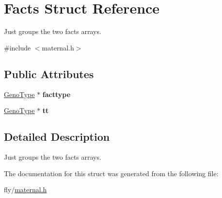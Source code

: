 \hypertarget{structFacts}{
\section{Facts Struct Reference}
\label{structFacts}
}


Just groups the two facts arrays.  


{\ttfamily \#include $<$maternal.h$>$}\subsection*{Public Attributes}
\begin{DoxyCompactItemize}
\item 
\hypertarget{structFacts_a0d792f87a2746b6e62a3f22ebc82898a}{
\hyperlink{structGenoType}{GenoType} $\ast$ {\bfseries facttype}}
\label{structFacts_a0d792f87a2746b6e62a3f22ebc82898a}

\item 
\hypertarget{structFacts_a31f1b9a8105c6b14c534ac2dc15b616e}{
\hyperlink{structGenoType}{GenoType} $\ast$ {\bfseries tt}}
\label{structFacts_a31f1b9a8105c6b14c534ac2dc15b616e}

\end{DoxyCompactItemize}


\subsection{Detailed Description}
Just groups the two facts arrays. 

The documentation for this struct was generated from the following file:\begin{DoxyCompactItemize}
\item 
fly/\hyperlink{maternal_8h}{maternal.h}\end{DoxyCompactItemize}
